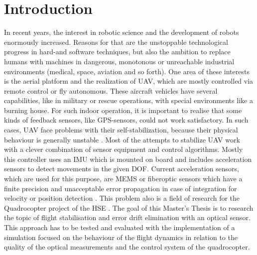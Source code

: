 
\chapter{Introduction}
\label{mt:c:introduction}


In recent years, the interest in robotic science and the development of
robots enormously increased. Reasons for that are the unstoppable technological
progress in hard-and software techniques, but also the ambition to replace
humans with machines in dangerous, monotonous or unreachable industrial
environments (medical, space, aviation and so forth).
One area of these interests
is the aerial platform and the realization of \gls{UAV}, which are mostly controlled
via remote control or fly autonomous. These aircraft vehicles have several
capabilities, like in military or rescue operations, with special environments like
a burning house. For such indoor operation, it is important to
realise that some kinds of feedback sensors, like GPS-sensors, could not work
satisfactory. In such cases, \gls{UAV} face problems with their self-stabilization,
because their physical behaviour is generally unstable 
. Most of the attempts to stabilize
\gls{UAV} work with a clever combination of sensor equipment and control algorithms.
Mostly this controller uses an \gls{IMU} which is mounted on board and includes
acceleration sensors to detect movements in the given \gls{DOF}.
\newpage
Current acceleration
sensors, which are used for this purpose, are \gls{MEMS} or fiberoptic sensors which
have a finite precision and unacceptable error propagation in case of integration
for velocity or position detection 
.
 This problem also is a field of research for the Quadrocopter project of the
 \gls{HSE} . The goal of this Master's Thesis is to
research the topic of flight stabilisation and error drift elimination with an
optical sensor. This approach has to be tested and evaluated with the implementation of
a simulation focused on the behaviour of the flight dynamics in relation to the 
quality of the optical measurements and the control system of the quadrocopter.  

